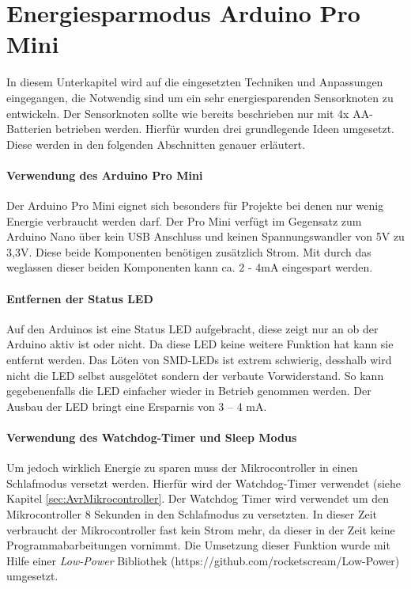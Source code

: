 \section{Energiesparmodus Arduino Pro Mini}
In diesem Unterkapitel wird auf die eingesetzten Techniken und Anpassungen eingegangen, die Notwendig sind um ein sehr energiesparenden Sensorknoten zu entwickeln. Der Sensorknoten sollte wie bereits beschrieben nur mit 4x AA-Batterien betrieben werden. Hierfür wurden drei grundlegende Ideen umgesetzt. Diese werden in den folgenden Abschnitten genauer erläutert. 
\paragraph{Verwendung des Arduino Pro Mini} Der Arduino Pro Mini eignet sich besonders für Projekte bei denen nur wenig Energie verbraucht werden darf. Der Pro Mini verfügt im Gegensatz zum Arduino Nano über kein USB Anschluss und keinen Spannungswandler von 5V zu 3,3V. Diese beide Komponenten benötigen zusätzlich Strom. Mit durch das weglassen dieser beiden Komponenten kann ca. 2 - 4mA eingespart werden.
\paragraph{Entfernen der Status LED} Auf den Arduinos ist eine Status LED aufgebracht, diese zeigt nur an ob der Arduino aktiv ist oder nicht. Da diese LED keine weitere Funktion hat kann sie entfernt werden. Das Löten von SMD-LEDs ist extrem schwierig, desshalb wird nicht die LED selbst ausgelötet sondern der verbaute Vorwiderstand. So kann gegebenenfalls die LED einfacher wieder in Betrieb genommen werden. Der Ausbau der LED bringt eine Ersparnis von 3 – 4 mA.
\paragraph{Verwendung des  Watchdog-Timer und Sleep Modus} Um jedoch wirklich Energie zu sparen muss der Mikrocontroller in einen Schlafmodus versetzt werden. Hierfür wird der Watchdog-Timer verwendet (siehe Kapitel \ref{sec:AvrMikrocontroller}. Der Watchdog Timer wird verwendet um den Mikrocontroller 8 Sekunden in den Schlafmodus zu versetzten. In dieser Zeit verbraucht der Mikrocontroller fast kein Strom mehr, da dieser in der Zeit keine Programmabarbeitungen vornimmt. Die Umsetzung dieser Funktion wurde mit Hilfe einer \textit{Low-Power} Bibliothek (https://github.com/rocketscream/Low-Power) umgesetzt.
